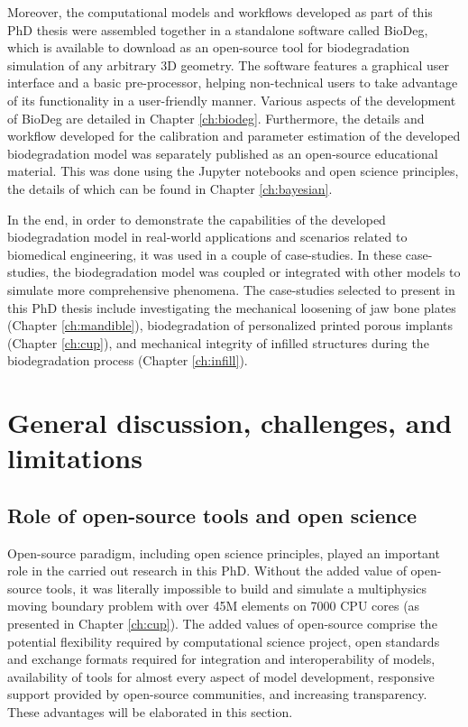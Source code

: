 Moreover, the computational models and workflows developed as part of this PhD thesis were assembled together in a standalone software called BioDeg, which is available to download as an open-source tool for biodegradation simulation of any arbitrary 3D geometry. The software features a graphical user interface and a basic pre-processor, helping non-technical users to take advantage of its functionality in a user-friendly manner. Various aspects of the development of BioDeg are detailed in Chapter \ref{ch:biodeg}. Furthermore, the details and workflow developed for the calibration and parameter estimation of the developed biodegradation model was separately published as an open-source educational material. This was done using the Jupyter notebooks and open science principles, the details of which can be found in Chapter \ref{ch:bayesian}.

In the end, in order to demonstrate the capabilities of the developed biodegradation model in real-world applications and scenarios related to biomedical engineering, it was used in a couple of case-studies. In these case-studies, the biodegradation model was coupled or integrated with other models to simulate more comprehensive phenomena. The case-studies selected to present in this PhD thesis include investigating the mechanical loosening of jaw bone plates (Chapter \ref{ch:mandible}), biodegradation of personalized printed porous implants (Chapter \ref{ch:cup}), and mechanical integrity of infilled structures during the biodegradation process (Chapter \ref{ch:infill}).



\section{General discussion, challenges, and limitations}

\subsection{Role of open-source tools and open science} \label{sec:open_source}


Open-source paradigm, including open science principles, played an important role in the carried out research in this PhD. Without the added value of open-source tools, it was literally impossible to build and simulate a multiphysics moving boundary problem with over 45M elements on 7000 CPU cores (as presented in Chapter \ref{ch:cup}). The added values of open-source comprise the potential flexibility required by computational science project, open standards and exchange formats required for integration and interoperability of models, availability of tools for almost every aspect of model development, responsive support provided by open-source communities, and increasing transparency. These advantages will be elaborated in this section.

